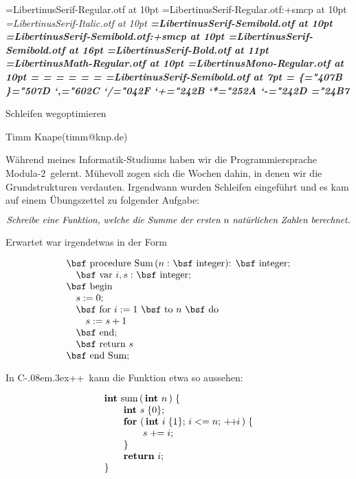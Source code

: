 \pagewidth 21cm \hsize 16cm
\pageheight 14.8cm \vsize 10.8cm

\font\rm={LibertinusSerif-Regular.otf} at 10pt \rm
\font\sc={LibertinusSerif-Regular.otf:+smcp} at 10pt
\font\it={LibertinusSerif-Italic.otf} at 10pt
\font\bf={LibertinusSerif-Semibold.otf} at 10pt
\font\bsf={LibertinusSerif-Semibold.otf:+smcp} at 10pt
\font\tf={LibertinusSerif-Semibold.otf} at 16pt
\font\bbf={LibertinusSerif-Bold.otf} at 11pt
\font\mf={LibertinusMath-Regular.otf} at 10pt
\font\monof={LibertinusMono-Regular.otf} at 10pt
=\rm
{}=\it
{}=\rm
{}=\rm
{}=\mf
{}=\monof
\font\rms={LibertinusSerif-Semibold.otf} at 7pt
=\rms
\mathchardef\{="407B
\mathchardef\}="507D
\mathcode`,="602C
\mathcode`/="042F
\mathcode`+="242B
\mathcode`*="252A
\mathcode`-="242D
\mathchardef\cdot="24B7
\fi
\centerline{\tf Schleifen wegoptimieren}
\medskip
\centerline{Timm Knape\quad(timm@knp.de)}
\def\section#1{\bigskip\noindent{\bbf #1}\medskip\noindent}
\def\cpp{C\kern-.08em\raise.3ex\hbox{++}}
\def\modula{\hbox{\sc Modula-$2$}}
\section{Aufgabenstellung}%
%
Während meines Informatik-Studiums haben wir die
Programmiersprache \modula\ gelernt.
Mühevoll zogen sich die Wochen dahin, in denen wir die
Grundstrukturen verdauten.
Irgendwann wurden Schleifen eingeführt und es kam auf
einem Übungszettel zu folgender Aufgabe:

$$\hbox{\it Schreibe eine Funktion, welche die 
Summe der ersten $n$ natürlichen Zahlen berechnet.}$$

\noindent Erwartet war irgendetwas in der Form

$$\vbox{\halign{#\hfil\cr
{\bsf procedure} Sum$\,(n:$ {\bsf integer}): {\bsf integer};\cr
\quad{\bsf var} $i,s:$ {\bsf integer};\cr
{\bsf begin}\cr
\quad $s := 0;$\cr
\quad{\bsf for} $i := 1$ {\bsf to} $n$ {\bsf do}\cr
\qquad $s := s + 1$\cr
\quad{\bsf end};\cr
\quad{\bsf return} $s$\cr
{\bsf end} Sum;\cr}}$$

\noindent In \cpp\ kann die Funktion etwa so aussehen:

$$\vbox{\halign{#\hfil\cr
{\bf int} sum$\,(\,${\bf int} $n\,)\;\{$\cr
\qquad{\bf int} $s\;\{0\};$\cr
\qquad{\bf for} ($\,${\bf int} $i\;\{1\}$; $i <= n$; $+\!\!+\!\!i\,)\;\{$\cr
\qquad\qquad $s \mathrel{+\!\!=} i$;\cr
\qquad$\}$\cr
\qquad{\bf return} $i$;\cr
$\}$\cr}}$$

